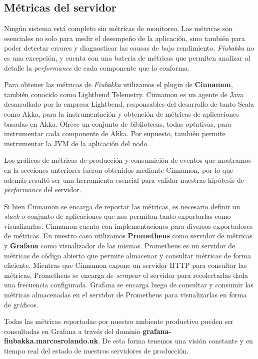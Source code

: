 \subsection{Métricas del servidor}

\noindent Ningún sistema está completo sin métricas de monitoreo. Las métricas son esenciales no solo para medir el desempeño de la aplicación, sino también para poder detectar errores y diagnosticar las causas de bajo rendimiento.
\textit{Fiubakka} no es una excepción, y cuenta con una batería de métricas que permiten analizar al detalle la \textit{performance} de cada componente que lo conforma.

Para obtener las métricas de \textit{Fiubakka} utilizamos el plugin de \textbf{Cinnamon}, también conocido como Lightbend Telemetry. Cinnamon es un agente de Java desarrollado por la empresa Lightbend, responsables del desarrollo de tanto Scala
como Akka, para la instrumentación y obtención de métricas de aplicaciones basadas en Akka. Ofrece un conjunto de bibliotecas, todas optativas, para instrumentar cada componente de Akka. Por supuesto, también permite instrumentar la JVM de la aplicación
del nodo.

Los gráficos de métricas de producción y consumición de eventos que mostramos en la secciones anteriores fueron obtenidos mediante Cinnamon, por lo que además resultó ser una herramienta esencial para validar nuestras hipótesis de \textit{performance}
del servidor.

Si bien Cinnamon se encarga de reportar las métricas, es necesario definir un \textit{stack} o conjunto de aplicaciones que nos permitan tanto exportarlas como visualizarlas. Cinnamon cuenta con implementaciones para diversos exportadores de métricas.
En nuestro caso utilizamos \textbf{Prometheus} como servidor de métricas y \textbf{Grafana} como visualizador de las mismas. Prometheus es un servidor de métricas de código abierto que permite almacenar y consultar métricas de forma eficiente.
Mientras que Cinnamon expone un servidor HTTP para consultar las métricas, Prometheus se encarga de \textit{scrapear} el servidor para recolectarlas dada una frecuencia configurada. Grafana se encarga luego de consultar y consumir las métricas almacenadas
en el servidor de Prometheus para visualizarlas en forma de gráficos.

Todas las métricas reportadas por nuestro ambiente productivo pueden ser consultadas en Grafana a través del dominio \textbf{grafana-fiubakka.marcosrolando.uk}. De esta forma tenemos una visión constante y en tiempo real del estado de nuestros servidores de producción.

